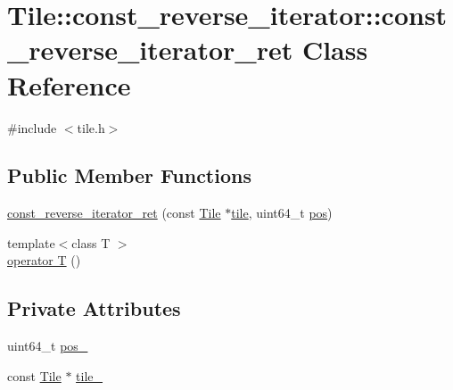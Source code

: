 \hypertarget{classTile_1_1const__reverse__iterator_1_1const__reverse__iterator__ret}{}\section{Tile\+:\+:const\+\_\+reverse\+\_\+iterator\+:\+:const\+\_\+reverse\+\_\+iterator\+\_\+ret Class Reference}
\label{classTile_1_1const__reverse__iterator_1_1const__reverse__iterator__ret}


{\ttfamily \#include $<$tile.\+h$>$}

\subsection*{Public Member Functions}
\begin{DoxyCompactItemize}
\item 
\hyperlink{classTile_1_1const__reverse__iterator_1_1const__reverse__iterator__ret_a2d4ca34a843f9e40827840557ec1a163}{const\+\_\+reverse\+\_\+iterator\+\_\+ret} (const \hyperlink{classTile}{Tile} $\ast$\hyperlink{classTile_1_1const__reverse__iterator_ac30fa99b5b0d172a238701e54e5276bf}{tile}, uint64\+\_\+t \hyperlink{classTile_1_1const__reverse__iterator_ac88135a4eba24eb2f353026486ac44d3}{pos})
\item 
{\footnotesize template$<$class T $>$ }\\\hyperlink{classTile_1_1const__reverse__iterator_1_1const__reverse__iterator__ret_a7d740afa0d566bf62faa1685735bda2c}{operator T} ()
\end{DoxyCompactItemize}
\subsection*{Private Attributes}
\begin{DoxyCompactItemize}
\item 
uint64\+\_\+t \hyperlink{classTile_1_1const__reverse__iterator_1_1const__reverse__iterator__ret_a444e0e8a11cf929858375db645c8624c}{pos\+\_\+}
\item 
const \hyperlink{classTile}{Tile} $\ast$ \hyperlink{classTile_1_1const__reverse__iterator_1_1const__reverse__iterator__ret_a4e0fd3c1cfb7ade67642633609e45f36}{tile\+\_\+}
\end{DoxyCompactItemize}


